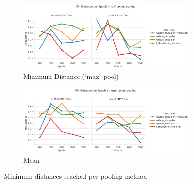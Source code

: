 \begin{figure}[htpb]
  \centering
  \begin{subfigure}{\linewidth}
    \centering
    \includegraphics[width=0.6\linewidth]{assets/evaluation/cam-attn/ro_random-cam_attn-max-mindist.png}
    \caption{Minimum Distance (`max' pool)}\label{subfig:cam-attn-max-mindist-cnn}
  \end{subfigure}

  \begin{subfigure}{\linewidth}
    \centering
    \includegraphics[width=0.6\linewidth]{assets/evaluation/cam-attn/ro_random-cam_attn-mean-mindist.png}
    \caption{Mean}\label{subfig:cam-attn-mean-mindist-cnn}
  \end{subfigure}
  \caption{Minimum distances reached per pooling method}\label{fig:cam-attn-mindist-cnn}
\end{figure}


